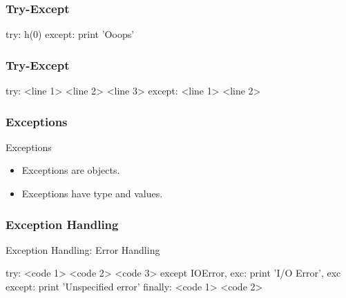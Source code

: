 \begin{frame}[fragile]
\frametitle{Try-Except}

\begin{python}
try:
    h(0)
except:
    print 'Ooops'
\end{python}
\end{frame}

\begin{frame}[fragile]
\frametitle{Try-Except}

\begin{python}
try:
    <line 1>
    <line 2>
    <line 3>
except:
    <line 1>
    <line 2>
\end{python}
\end{frame}

\begin{frame}[fragile]
\frametitle{Exceptions}

\begin{block}{Exceptions}
\begin{itemize}
\item Exceptions are \alert{objects}.
\item Exceptions have \alert{type} and \alert{values}.
\end{itemize}
\end{block}
\end{frame}

\begin{frame}[fragile]
\frametitle{Exception Handling}

\begin{block}{Exception Handling: Error Handling}
\begin{python}
try:
    <code 1>
    <code 2>
    <code 3>
except IOError, exc:
    print 'I/O Error', exc
except:
    print 'Unspecified error'
finally:
    <code 1>
    <code 2>
\end{python}
\end{block}
\end{frame}

